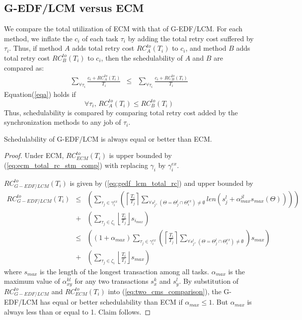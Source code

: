 \subsection{G-EDF/LCM versus ECM}\label{subsec:gedf_lcm_vs_ecm}
%
We compare the total utilization of ECM with that of G-EDF/LCM. For each method, we inflate the $c_i$ of each task $\tau_i$ by adding the total retry cost suffered by $\tau_i$. Thus, if method $A$ adds total retry cost $RC_A^{to}(T_i)$ to $c_i$, and method $B$ adds total retry cost $RC_B^{to}(T_i)$ to $c_i$, then the schedulability of $A$ and $B$ are compared as:
%
\begin{eqnarray}
\sum_{\forall \tau_{i}}\frac{c_{i}+RC_A^{to}(T_{i})}{T_{i}} & \le & \sum_{\forall \tau_{i}}\frac{c_{i}+RC_B^{to}(T_{i})}{T_{i}}
\label{eqa}
\end{eqnarray}
%
Equation(\ref{eqa}) holds if 
\begin{equation}
\forall \tau_i,\, RC_A^{to}(T_{i}) \le RC_B^{to}(T_{i})
\label{eq:two_cms_comparison}
\end{equation}
Thus, schedulability is compared by comparing total retry cost added by the synchronization methods to any job of $\tau_i$.
%
\begin{clm}\label{lcm versus ecm}
Schedulability of G-EDF/LCM is always equal or better than ECM.
%
\end{clm}
%
\begin{proof}\normalfont
%
Under ECM, $RC_{ECM}^{to}(T_{i})$ is upper bounded by (\ref{eq:ecm_total_rc_stm_comp}) with replacing $\gamma_i$ by $\gamma_i^{ex}$. 

$RC_{G-EDF/LCM}^{to}(T_i)$ is given by (\ref{eq:gedf_lcm_total_rc}) and upper bounded by 
%
\begin{eqnarray}
RC_{G-EDF/LCM}^{to}\left(T_i\right) & \le & \left(\sum_{\tau_{j}\in\gamma_i^{ex}}\left(\left\lceil\frac{T_i}{T_j}\right\rceil \sum_{\forall s_j^l,\,\left(\Theta=\Theta_j^l \cap \Theta_i^{ex}\right) \neq \emptyset} len\left(s_{j}^{l} +
\alpha_{max}^{jl}s_{max}(\Theta)\right)\right)\right)\nonumber\\
& + & 
\left(\sum_{\tau_j \in \zeta_i}\left\lfloor \frac{T_{i}}{T_{j}}\right\rfloor s_{i_{max}}\right)\nonumber\\
%
& \le & \left(\left(1+\alpha_{max}\right)\sum_{\tau_{j}\in\gamma_i^{ex}}\left(\left\lceil\frac{T_i}{T_j}\right\rceil  \sum_{\forall s_j^l,\,\left(\Theta=\Theta_j^l \cap \Theta_i^{ex}\right) \neq \emptyset} \right)s_{max}\right)\nonumber\\
& + &
\left(\sum_{\tau_j \in \zeta_i}\left\lfloor \frac{T_{i}}{T_{j}}\right\rfloor s_{max} \right)
\label{eq:gedf_lcm_vs_ecm_1}
\end{eqnarray}
%
where $s_{max}$ is the length of the longest transaction among all tasks. $\alpha_{max}$ is the maximum value of $\alpha_{xy}^{kl}$ for any two transactions $s_x^k$ and $s_y^l$.
By substitution of $RC_{G-EDF/LCM}^{to}$ and $RC_{ECM}^{to}(T_{i})$ into (\ref{eq:two_cms_comparison}), the G-EDF/LCM has equal or better schedulability than ECM if $\alpha_{max} \le 1$. But $\alpha_{max}$ is always less than or equal to 1. Claim follows.
%
\end{proof}
%
